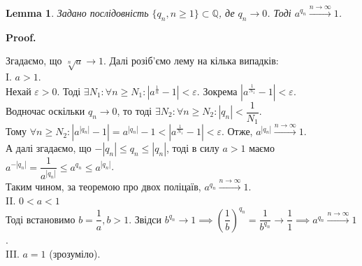 \documentclass[a4paper, 14pt]{article}
\makeatletter
\def\qed{$\blacksquare$}
\theoremstyle{theoremdd}
\theoremstyle{theoremdd}
\theoremstyle{theoremdd}
\theoremstyle{theoremdd}
\theoremstyle{theoremdd}
\theoremstyle{theoremdd}
\theoremstyle{theoremdd}
\newtheorem{lemma}[theorem]{Lemma}
\theoremstyle{theoremdd}
\renewenvironment{proof}[1][Proof.\\]{\par
\pushQED{\hfill \qed}%
\normalfont \topsep6\p@\@plus6\p@\relax
\trivlist
\item\relax
{\bfseries
#1\@addpunct{.}}\hspace\labelsep\ignorespaces
}{%
\popQED\endtrivlist\@endpefalse
}
\makeatother
\begin{document}
\begin{lemma}
Задано послідовність $\{q_n, n \geq 1\} \subset \mathbb{Q}$, де $q_n \to 0$. Тоді $a^{q_n} \xrightarrow{n \to \infty} 1$.
\end{lemma}

\begin{proof}
Згадаємо, що $\sqrt[n]{a} \to 1$. Далі розіб'ємо лему на кілька випадків:\\
I. $a > 1$.\\
Нехай $\varepsilon > 0$. Тоді $\exists N_1: \forall n \geq N_1: |a^{\frac{1}{n}} - 1| < \varepsilon$. Зокрема $|a^{\frac{1}{N_1}}-1|<\varepsilon$.\\
Водночас оскільки $q_n \to 0$, то тоді $\exists N_2: \forall n \geq N_2: |q_n| < \dfrac{1}{N_1}$.\\
Тому $\forall n \geq N_2: |a^{|q_n|}-1| = a^{|q_n|} - 1 < |a^{\frac{1}{N_1}} - 1| < \varepsilon$. Отже, $a^{|q_n|} \overset{n \to \infty}{\longrightarrow} 1$.\\
А далі згадаємо, що $-|q_n| \leq q_n \leq |q_n|$, тоді в силу $a > 1$ маємо $a^{-|q_n|} = \dfrac{1}{a^{|q_n|}} \leq a^{q_n} \leq a^{|q_n|}$.\\
Таким чином, за теоремою про двох поліцаїв, $a^{q_n} \overset{n \to \infty}{\longrightarrow} 1$.
\bigskip \\
II. $0 < a < 1$\\
Тоді встановимо $b = \dfrac{1}{a}, b > 1$. Звідси $b^{q_n} \to 1 \implies \left(\dfrac{1}{b} \right)^{q_n} = \dfrac{1}{b^{q_n}} \to \dfrac{1}{1} \implies a^{q_n} \xrightarrow{n \to \infty} 1$.
\bigskip \\
III. $a = 1$ (зрозуміло).
\end{proof}

\iffalse %
\begin{lemma}
$|a^q-1| \leq 2|q|(a-1)$, якщо $a>1$ та $q \in \mathbb{Q}: |q| \leq 1$.
\end{lemma}

\begin{proof}
1) Розглянемо дріб $q = \dfrac{1}{n}, n \in \mathbb{N}$. Позначимо $\alpha = a^{\frac{1}{n}}-1 > 0$. Тоді за нерівністю Бернуллі,\\
$(1+\alpha)^n \geq 1 + \alpha n \implies a \geq 1 + \alpha n$.\\
$\alpha = a^{\frac{1}{n}} - 1 \leq \dfrac{1}{n}(a-1) < 2 \dfrac{1}{n} (a-1) \implies |a^q-1| < 2q(a-1)$ - та сама нерівність.
\bigskip \\
2) Нехай тепер маємо будь-яке раціональне число $0 < q < 1$. Тоді знайдеться таке $n \in \mathbb{N}$, що $\dfrac{1}{n+1} < q < \dfrac{1}{n}$. А тому $|a^q - 1| < |a^{\frac{1}{n}} - 1| \leq \dfrac{1}{n}(a-1) < 2r(a-1)$.
\bigskip \\
3) Нарешті, $-1 < q < 0$, але ми робимо заміну $r = -q$ - приходимо до 2), тоді $a^r - 1 < 2r(a-1)$\\
$a^{-q} - 1 < 2(-q)(a-1) \implies 1-a^q = |a^q-1| < 2|q|(a-1)a^q < 2|q|(a-1)$
\end{proof}
\fi
\end{document}
